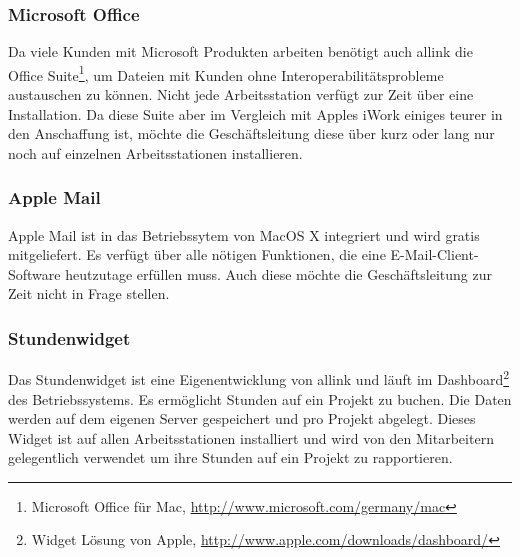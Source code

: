 \subsubsection{Microsoft Office}
Da viele Kunden mit Microsoft Produkten arbeiten benötigt auch allink die
Office Suite\footnote{Microsoft Office für Mac, \url{http://www.microsoft.com/germany/mac}}, 
um Dateien mit Kunden ohne Interoperabilitätsprobleme austauschen zu können. 
Nicht jede Arbeitsstation verfügt zur Zeit über eine Installation. Da diese
Suite aber im Vergleich mit Apples iWork einiges teurer in den Anschaffung ist,
möchte die Geschäftsleitung diese über kurz oder lang nur noch auf einzelnen
Arbeitsstationen installieren.

\subsubsection{Apple Mail}
Apple Mail ist in das Betriebssytem von MacOS X integriert und wird gratis
mitgeliefert. Es verfügt über alle nötigen Funktionen, die eine E-Mail-Client-Software
heutzutage erfüllen muss. Auch diese möchte die Geschäftsleitung zur Zeit nicht
in Frage stellen.

\subsubsection{Stundenwidget}
Das Stundenwidget ist eine Eigenentwicklung von allink und läuft
im Dashboard\footnote{Widget Lösung von Apple, \url{http://www.apple.com/downloads/dashboard/}}
des Betriebssystems. Es ermöglicht Stunden auf ein Projekt zu buchen.
Die Daten werden auf dem eigenen Server gespeichert und pro Projekt abgelegt. Dieses Widget ist auf allen
Arbeitsstationen installiert und wird von den Mitarbeitern gelegentlich verwendet
um ihre Stunden auf ein Projekt zu rapportieren.

